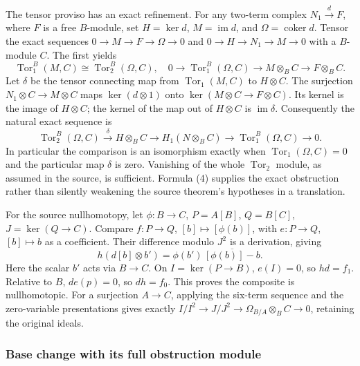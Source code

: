 The tensor proviso has an exact refinement. For any two-term complex \(N_1\xrightarrow d F\), where \(F\) is a free \(B\)-module, set \(H=\ker d\), \(M=\operatorname{im}d\), and \(\Omega=\operatorname{coker}d\). Tensor the exact sequences \(0\to M\to F\to\Omega\to0\) and \(0\to H\to N_1\to M\to0\) with a \(B\)-module \(C\). The first yields \[
\operatorname{Tor}_1^B(M,C)\cong\operatorname{Tor}_2^B(\Omega,C),
\quad
0\to\operatorname{Tor}_1^B(\Omega,C)\to M\otimes_B C\to F\otimes_B C.
\] Let \(\delta\) be the tensor connecting map from \(\operatorname{Tor}_1(M,C)\) to \(H\otimes C\). The surjection \(N_1\otimes C\to M\otimes C\) maps \(\ker(d\otimes1)\) onto \(\ker(M\otimes C\to F\otimes C)\). Its kernel is the image of \(H\otimes C\); the kernel of the map out of \(H\otimes C\) is \(\operatorname{im}\delta\). Consequently the natural exact sequence is \[
\operatorname{Tor}_2^B(\Omega,C)\xrightarrow\delta H\otimes_B C
\longrightarrow H_1(N\otimes_B C)
\longrightarrow\operatorname{Tor}_1^B(\Omega,C)\longrightarrow0.\tag{4}
\] In particular the comparison is an isomorphism exactly when \(\operatorname{Tor}_1(\Omega,C)=0\) and the particular map \(\delta\) is zero. Vanishing of the whole \(\operatorname{Tor}_2\) module, as assumed in the source, is sufficient. Formula (4) supplies the exact obstruction rather than silently weakening the source theorem's hypotheses in a translation.

For the source nullhomotopy, let \(\phi:B\to C\), \(P=A[B]\), \(Q=B[C]\), \(J=\ker(Q\to C)\). Compare \(f:P\to Q\), \([b]\mapsto[\phi(b)]\), with \(e:P\to Q\), \([b]\mapsto b\) as a coefficient. Their difference modulo \(J^2\) is a derivation, giving \[
h(d[b]\otimes b')=\phi(b')\,\overline{[\phi(b)]-b}.
\] Here the scalar \(b'\) acts via \(B\to C\). On \(I=\ker(P\to B)\), \(e(I)=0\), so \(hd=f_1\). Relative to \(B\), \(de(p)=0\), so \(dh=f_0\). This proves the composite is nullhomotopic. For a surjection \(A\to C\), applying the six-term sequence and the zero-variable presentations gives exactly \(I/I^2\to J/J^2\to\Omega_{B/A}\otimes_B C\to0\), retaining the original ideals.

\subsubsection{Base change with its full obstruction module}\label{algebra-proof-044-base-change-with-its-full-obstruction-module}


